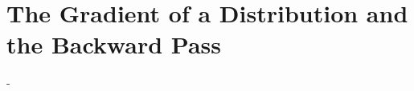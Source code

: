 \ifdefined\ispartofbook
\else
  
  
\fi

\section{The Gradient of a Distribution and the Backward Pass}
\label{sec:backward_pass_distribution}

-

\ifdefined\ispartofbook
\else
  
\fi
